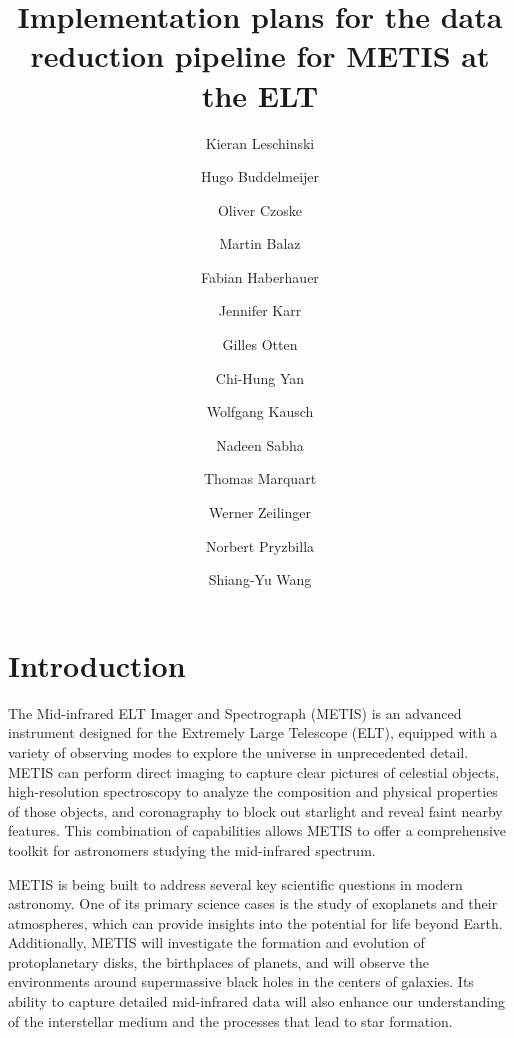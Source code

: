 \documentclass[a4paper]{spie}  %
\title{Implementation plans for the data reduction pipeline for METIS at the ELT }
\author[a]{Kieran Leschinski}
\author[a]{Hugo Buddelmeijer}
\author[a]{Oliver Czoske}
\author[a]{Martin Balaz}
\author[a]{Fabian Haberhauer}
\author[a]{Jennifer Karr}
\author[a]{Gilles Otten}
\author[a]{Chi-Hung Yan}
\author[a]{Wolfgang Kausch}
\author[a]{Nadeen Sabha}
\author[a]{Thomas Marquart}
\author[a]{Werner Zeilinger}
\author[a]{Norbert Pryzbilla}
\author[a]{Shiang-Yu Wang}
\affil[a]{University of Vienna, T\"urkenschanztra\ss e 18, 1180 Vienna, Austria}
\begin{document}
 
\maketitle

\begin{abstract}
\lipsum[1]

\end{abstract}



\section{Introduction}
\label{sec:introduction}




The Mid-infrared ELT Imager and Spectrograph (METIS) is an advanced instrument designed for the Extremely Large Telescope (ELT), equipped with a variety of observing modes to explore the universe in unprecedented detail. METIS can perform direct imaging to capture clear pictures of celestial objects, high-resolution spectroscopy to analyze the composition and physical properties of those objects, and coronagraphy to block out starlight and reveal faint nearby features. This combination of capabilities allows METIS to offer a comprehensive toolkit for astronomers studying the mid-infrared spectrum.

METIS is being built to address several key scientific questions in modern astronomy. One of its primary science cases is the study of exoplanets and their atmospheres, which can provide insights into the potential for life beyond Earth. Additionally, METIS will investigate the formation and evolution of protoplanetary disks, the birthplaces of planets, and will observe the environments around supermassive black holes in the centers of galaxies. Its ability to capture detailed mid-infrared data will also enhance our understanding of the interstellar medium and the processes that lead to star formation.
\end{document}
